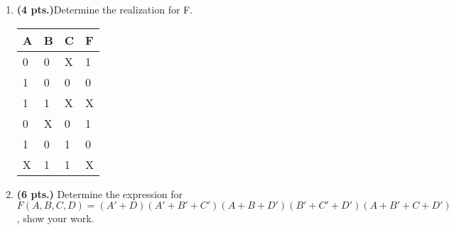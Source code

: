 \documentclass{article}
\begin{document}
\begin{enumerate}
\item {\bf (4 pts.)}Determine the \SOPmin realization for F.


\begin{tabular}{l|l|l||l}
A & B & C & F \\ \hline \hline
0 & 0 & X & 1 \\ \hline
1 & 0 & 0 & 0 \\ \hline
1 & 1 & X & X \\ \hline
0 & X & 0 & 1 \\ \hline
1 & 0 & 1 & 0 \\ \hline
X & 1 & 1 & X \\ 
\end{tabular}


\item {\bf (6 pts.)} Determine the \POSmin expression for \\
$F(A,B,C,D)=(A'+D)(A'+B'+C')(A+B+D')(B'+C'+D')(A+B'+C+D')$,
show your work.

\end{enumerate}
\end{document}
